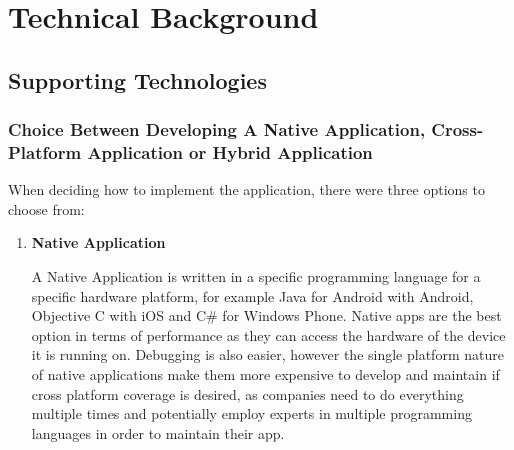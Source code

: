 \documentclass[ %
                    author={Jonathan Rankin},
                supervisor={Dr. David May, Dr. Ian Holyer},
                    degree={MEng},
                     title={CodeTouch},
                  subtitle={A Revolutionary Way To Program Real Code On Touch Screen Devices},
                      type={enterprise},
                      year={2015 } ]{dissertation}
\begin{document}
\chapter{Technical Background}
\label{chap:technical}

\section{Supporting Technologies}
\subsection{Choice Between Developing A Native Application, Cross-Platform Application or Hybrid Application }
When deciding how to implement the application, there were three options to choose from:
\begin{enumerate}
\item \textbf{Native Application}
\begin{itemize}
A Native Application is written in a specific programming language for a specific hardware platform, for example Java for Android with Android, Objective C with iOS and C# for Windows Phone. Native apps are the best option in terms of performance as they can access the hardware of the device it is running on. Debugging is also easier, however the single platform nature of native applications make them more expensive to develop and maintain if cross platform coverage is desired, as companies need to do everything multiple times and potentially employ experts in multiple programming languages in order to maintain their app. 
\end{itemize}



\end{enumerate}
\end{document}
